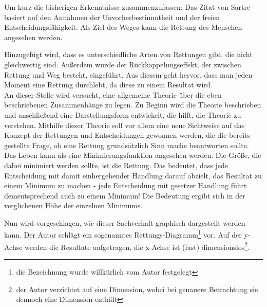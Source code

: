 \documentclass[12pt,a4paper,oneside]{article}
\begin{document}
  Um kurz die bisherigen Erkenntnisse zusammenzufassen: Das Zitat von Sartre basiert auf den Annahmen der Unvorherbestimmtheit und der freien Entscheidungsfähigkeit. Als Ziel des Weges kann die Rettung des Menschen angesehen werden. 
  
  Hinzugefügt wird, dass es unterschiedliche Arten von Rettungen gibt, die nicht gleichwertig sind. Außerdem wurde der Rückkoppelungseffekt, der zwischen Rettung und Weg besteht, eingeführt. Aus diesem geht hervor, dass man jeden Moment eine Rettung durchlebt, da diese zu einem Resultat wird. \\
  
  An dieser Stelle wird versucht, eine allgemeine Theorie über die eben beschriebenen Zusammenhänge zu legen. Zu Beginn wird die Theorie beschrieben und anschließend eine Darstellungsform entwickelt, die hilft, die Theorie zu verstehen. Mithilfe dieser Theorie soll vor allem eine neue Sichtweise auf das Konzept der Rettungen und Entscheidungen gewonnen werden, die die bereits gestellte Frage, ob eine Rettung grundsätzlich Sinn mache beantworten sollte. \\
  
  
  
  
  Das Leben kann als eine Minimierungsfunktion angesehen werden. Die Größe, die dabei minimiert werden sollte, ist die Rettung. Das bedeutet, dass jede Entscheidung mit damit einhergehender Handlung darauf abzielt, das Resultat zu einem Minimum zu machen - jede Entscheidung mit gesetzer Handlung führt dementsprechend auch zu einem Minimum! Die Bedeutung ergibt sich in der verglichenen Höhe der einzelnen Minimums. 
  
  Nun wird vorgeschlagen, wie dieser Sachverhalt graphisch dargestellt werden kann. Der Autor schlägt ein sogenanntes Rettungs-Diagramm\footnote{die Bezeichnung wurde willkürlich vom Autor festgelegt} vor. Auf der y-Achse werden die Resultate aufgetragen, die x-Achse ist (fast) dimensionslos\footnote{der Autor verzichtet auf eine Dimension, wobei bei genauere Betrachtung sie dennoch eine Dimension enthält}.
  
\end{document}
